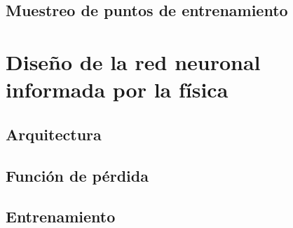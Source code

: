 \subsection{Muestreo de puntos de entrenamiento}


\section{Diseño de la red neuronal informada por la física}
\label{sec:diseno_pinn}

\subsection{Arquitectura}

\subsection{Función de pérdida}

\subsection{Entrenamiento}


